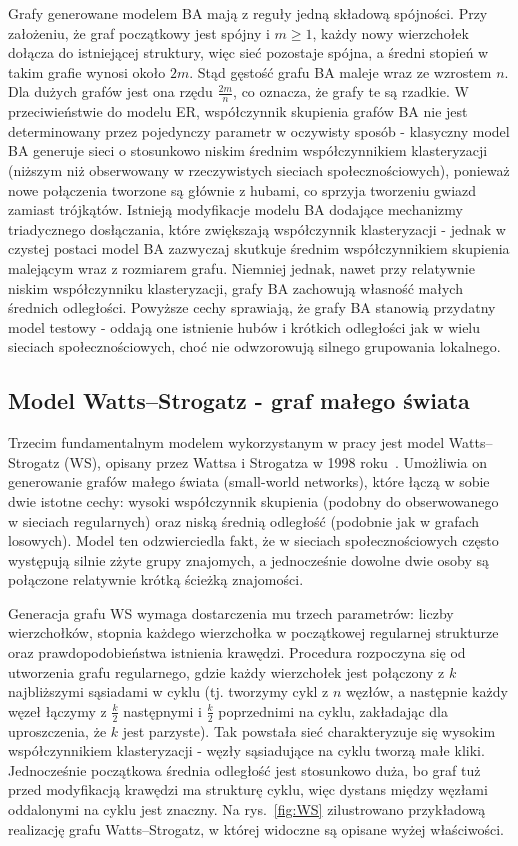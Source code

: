 Grafy generowane modelem BA mają z reguły jedną składową spójności. Przy założeniu, że graf początkowy jest spójny i $m \ge 1$, każdy nowy wierzchołek dołącza do istniejącej struktury, więc sieć pozostaje spójna, a średni stopień w takim grafie wynosi około $2m$. Stąd gęstość grafu BA maleje wraz ze wzrostem $n$. Dla dużych grafów jest ona rzędu $\frac{2m}{n}$, co oznacza, że grafy te są rzadkie. W przeciwieństwie do modelu ER, współczynnik skupienia grafów BA nie jest determinowany przez pojedynczy parametr w oczywisty sposób - klasyczny model BA generuje sieci o stosunkowo niskim średnim współczynnikiem klasteryzacji (niższym niż obserwowany w rzeczywistych sieciach społecznościowych), ponieważ nowe połączenia tworzone są głównie z hubami, co sprzyja tworzeniu gwiazd zamiast trójkątów. Istnieją modyfikacje modelu BA dodające mechanizmy triadycznego dosłączania, które zwiększają współczynnik klasteryzacji - jednak w czystej postaci model BA zazwyczaj skutkuje średnim współczynnikiem skupienia malejącym wraz z rozmiarem grafu. Niemniej jednak, nawet przy relatywnie niskim współczynniku klasteryzacji, grafy BA zachowują własność małych średnich odległości. Powyższe cechy sprawiają, że grafy BA stanowią przydatny model testowy - oddają one istnienie hubów i krótkich odległości jak w wielu sieciach społecznościowych, choć nie odwzorowują silnego grupowania lokalnego.

\subsection{Model Watts--Strogatz - graf małego świata}
Trzecim fundamentalnym modelem wykorzystanym w pracy jest model Watts--Strogatz (WS), opisany przez Wattsa i Strogatza w 1998 roku~\cite{Watts1998}. Umożliwia on generowanie grafów małego świata (small-world networks), które łączą w sobie dwie istotne cechy: wysoki współczynnik skupienia (podobny do obserwowanego w sieciach regularnych) oraz niską średnią odległość (podobnie jak w grafach losowych). Model ten odzwierciedla fakt, że w sieciach społecznościowych często występują silnie zżyte grupy znajomych, a jednocześnie dowolne dwie osoby są połączone relatywnie krótką ścieżką znajomości.

Generacja grafu WS wymaga dostarczenia mu trzech parametrów: liczby wierzchołków, stopnia każdego wierzchołka w początkowej regularnej strukturze oraz prawdopodobieństwa istnienia krawędzi. Procedura rozpoczyna się od utworzenia grafu regularnego, gdzie każdy wierzchołek jest połączony z $k$ najbliższymi sąsiadami w cyklu (tj. tworzymy cykl z $n$ węzłów, a następnie każdy węzeł łączymy z $\frac{k}{2}$ następnymi i $\frac{k}{2}$ poprzednimi na cyklu, zakładając dla uproszczenia, że $k$ jest parzyste). Tak powstała sieć charakteryzuje się wysokim współczynnikiem klasteryzacji - węzły sąsiadujące na cyklu tworzą małe kliki.
Jednocześnie początkowa średnia odległość jest stosunkowo duża, bo graf tuż przed modyfikacją krawędzi ma strukturę cyklu, więc dystans między węzłami oddalonymi na cyklu jest znaczny. Na rys.~\ref{fig:WS} zilustrowano przykładową realizację grafu Watts--Strogatz, w której widoczne są opisane wyżej właściwości.

